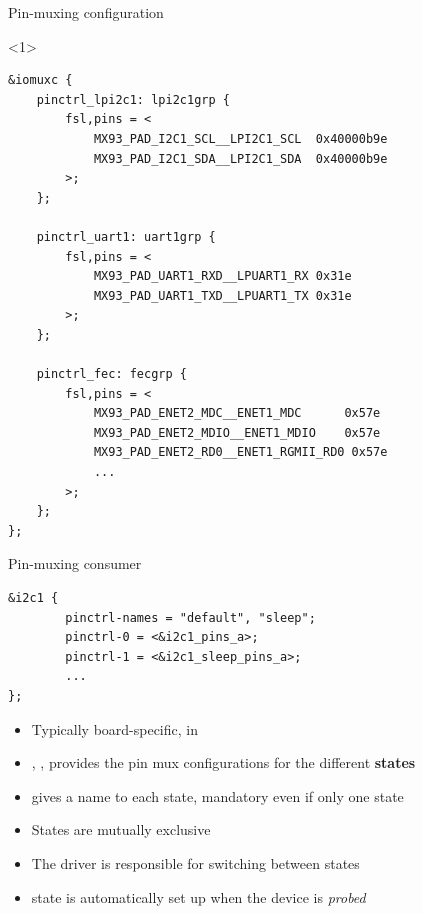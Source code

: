 \begin{frame}[fragile]{Pin-muxing configuration}
\begin{onlyenv}<1>
  \begin{block}{}
{\tiny
\begin{verbatim}
&iomuxc {
    pinctrl_lpi2c1: lpi2c1grp {
        fsl,pins = <
            MX93_PAD_I2C1_SCL__LPI2C1_SCL  0x40000b9e
            MX93_PAD_I2C1_SDA__LPI2C1_SDA  0x40000b9e
        >;
    };

    pinctrl_uart1: uart1grp {
        fsl,pins = <
            MX93_PAD_UART1_RXD__LPUART1_RX 0x31e
            MX93_PAD_UART1_TXD__LPUART1_TX 0x31e
        >;
    };

    pinctrl_fec: fecgrp {
        fsl,pins = <
            MX93_PAD_ENET2_MDC__ENET1_MDC      0x57e
            MX93_PAD_ENET2_MDIO__ENET1_MDIO    0x57e
            MX93_PAD_ENET2_RD0__ENET1_RGMII_RD0 0x57e
            ...
        >;
    };
};
\end{verbatim}
}
\end{block}
\end{onlyenv}
\end{frame}

\begin{frame}[fragile]{Pin-muxing consumer}
  \begin{block}{}
{\tiny
\begin{verbatim}
&i2c1 {
        pinctrl-names = "default", "sleep";
        pinctrl-0 = <&i2c1_pins_a>;
        pinctrl-1 = <&i2c1_sleep_pins_a>;
        ...
};
\end{verbatim}
}
\end{block}
\begin{itemize}
\item Typically board-specific, in 
\item {}, ,  provides
  the pin mux configurations for the different {\bf states}
\item {} gives a name to each state, mandatory even
  if only one state
\item States are mutually exclusive
\item The driver is responsible for switching between states
\item {} state is automatically set up when the device is
  {\em probed}
\end{itemize}
\end{frame}

